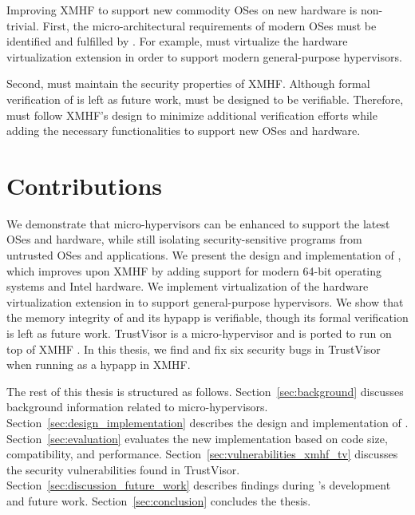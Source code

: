 Improving XMHF to support new commodity OSes on new hardware is non-trivial. First, the micro-architectural requirements of modern OSes must be identified and fulfilled by . For example,  must virtualize the hardware virtualization extension in order to support modern general-purpose hypervisors.

Second,  must maintain the security properties of XMHF. Although formal verification of  is left as future work,  must be designed to be verifiable. Therefore,  must follow XMHF's design to minimize additional verification efforts while adding the necessary functionalities to support new OSes and hardware.

\section{Contributions}

We demonstrate that micro-hypervisors can be enhanced to support the latest OSes and hardware, while still isolating security-sensitive programs from untrusted OSes and applications. We present the design and implementation of , which improves upon XMHF by adding support for modern 64-bit operating systems and Intel hardware. We implement virtualization of the hardware virtualization extension in  to support general-purpose hypervisors. We show that the memory integrity of  and its hypapp is verifiable, though its formal verification is left as future work. TrustVisor \cite{mccune2010trustvisor} is a micro-hypervisor and is ported to run on top of XMHF \cite{vasudevan2013design}. In this thesis, we find and fix six security bugs in TrustVisor when running as a hypapp in XMHF.

The rest of this thesis is structured as follows.
Section~\ref{sec:background} discusses background information related to micro-hypervisors.
Section~\ref{sec:design_implementation} describes the design and implementation of .
Section~\ref{sec:evaluation} evaluates the new  implementation based on code size, compatibility, and performance.
Section~\ref{sec:vulnerabilities_xmhf_tv} discusses the security vulnerabilities found in TrustVisor.
Section~\ref{sec:discussion_future_work} describes findings during 's development and future work.
Section~\ref{sec:conclusion} concludes the thesis.

